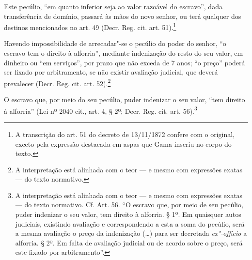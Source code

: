 Este pecúlio, ``em quanto inferior seja ao valor razoável do escravo'',
dada transferência de domínio, passará às mãos do novo senhor, ou terá
qualquer dos destinos mencionados no art. 49 (Decr. Reg. cit. art.
51).\footnote{A transcrição do art. 51 do decreto de 13/11/1872
  confere com o original, exceto pela expressão destacada em aspas que
  Gama inseriu no corpo do texto.}

Havendo impossibilidade de arrecadar"-se o pecúlio do poder do senhor, ``o
escravo tem o direito à alforria'', mediante indenização do resto do seu
valor, em dinheiro ou ``em serviços'', por prazo que não exceda de 7 anos;
``o preço'' poderá ser fixado por arbitramento, se não existir avaliação
judicial, que deverá prevalecer (Decr. Reg. cit. art. 52).\footnote{A
  interpretação está alinhada com o teor --- e mesmo com expressões exatas ---
  do texto normativo.}

O escravo que, por meio do seu pecúlio, puder indenizar o seu valor,
``tem direito à alforria'' (Lei nº 2040 cit., art. 4, § 2º; Decr. Reg.
cit. art. 56).\footnote{A interpretação está alinhada com o teor --- e
  mesmo com expressões exatas --- do texto normativo. Cf. Art. 56. ``O escravo
  que, por meio de seu pecúlio, puder indenizar o seu valor, tem direito
  à alforria. § 1º. Em quaisquer autos judiciais, existindo avaliação e
  correspondendo a esta a soma do pecúlio, será a mesma avaliação o
  preço da indenização (\ldots{}) para ser decretada \emph{ex"-officio} a
  alforria. § 2º. Em falta de avaliação judicial ou de acordo sobre o
  preço, será este fixado por arbitramento''.}

